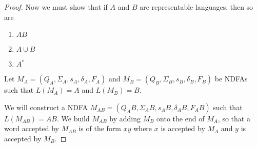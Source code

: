 \documentclass{bcthesis}
\begin{document}
\begin{proof}
		Now we must show that if $A$ and $B$ are representable languages, then so are
		\begin{enumerate}[label=(\roman*), itemsep = -0.3 ex, nolistsep]
			\item $AB$
			\item $A \cup B$
			\item $A^*$
		\end{enumerate}

			\newcommand{\ma}{\ensuremath{M_A}\xspace}
				\newcommand{\qa}{\ensuremath{Q_A}\xspace}
				\newcommand{\siga}{\ensuremath{\Sigma_A}\xspace}
				\newcommand{\sa}{\ensuremath{s_A}\xspace}
				\newcommand{\dala}{\ensuremath{\delta_A}\xspace}
				\newcommand{\fa}{\ensuremath{F_A}\xspace}

			\newcommand{\mb}{\ensuremath{M_B}\xspace}
				\newcommand{\qb}{\ensuremath{Q_B}\xspace}
				\newcommand{\sigb}{\ensuremath{\Sigma_B}\xspace}
				\renewcommand{\sb}{\ensuremath{s_B}\xspace}
				\newcommand{\dalb}{\ensuremath{\delta_B}\xspace}
				\newcommand{\fb}{\ensuremath{F_B}\xspace}

			\newcommand{\mab}{\ensuremath{M_{AB}}\xspace}
				\newcommand{\qab}{\ensuremath{Q_{AB}}\xspace}
				\newcommand{\sigab}{\ensuremath{\Sigma_{AB}}\xspace}
				\newcommand{\sab}{\ensuremath{s_{AB}}\xspace}
				\newcommand{\dalab}{\ensuremath{\delta_{AB}}\xspace}
				\newcommand{\fab}{\ensuremath{F_{AB}}\xspace}

			\newcommand{\maub}{\ensuremath{M_{A \cup B}}\xspace}
				\newcommand{\qaub}{\ensuremath{Q_{A \cup B}}\xspace}
				\newcommand{\sigaub}{\ensuremath{\Sigma_{A \cup B}}\xspace}
				\newcommand{\saub}{\ensuremath{s_{A \cup B}}\xspace}
				\newcommand{\dalaub}{\ensuremath{\delta_{A \cup B}}\xspace}
				\newcommand{\faub}{\ensuremath{F_{A \cup B}}\xspace}

			\newcommand{\mas}{\ensuremath{M_{A^*}}\xspace}
				\newcommand{\qas}{\ensuremath{Q_{A^*}}\xspace}
				\newcommand{\sigas}{\ensuremath{\Sigma_{A^*}}\xspace}
				\newcommand{\sas}{\ensuremath{s_{A^*}}\xspace}
				\newcommand{\dalas}{\ensuremath{\delta_{A^*}}\xspace}
				\newcommand{\fas}{\ensuremath{F_{A^*}}\xspace}


		Let $M_A = (Q_A, \Sigma_A, s_A, \delta_A, F_A)$ and $M_B = (Q_B, \Sigma_B, s_B, \delta_B, F_B)$ be NDFAs such that $L(\ma) = A$ and $L(\mb) = B$.

		We will construct a NDFA $M_{AB} = (Q_AB, \Sigma_AB, s_AB, \delta_AB, F_AB)$ such that $L(\mab) = AB$.
		We build \mab by adding \mb onto the end of \ma, so that a word accepted by \mab is of the form $xy$ where $x$ is accepted by \ma and $y$ is accepted by \mb.


\end{proof}
\end{document}
